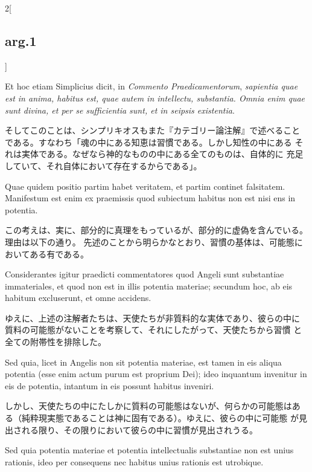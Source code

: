 \documentclass[paper=a4paper,fontsize=10pt,jafontsize=9pt,titlepage]{jlreq}
\begin{document}
\begin{paracol}{2}[\subsection{arg.1}]
\switchcolumn*

Et hoc etiam Simplicius dicit, in {\itshape Commento
 Praedicamentorum}, {\itshape sapientia quae est in anima, habitus est, quae
 autem in intellectu, substantia. Omnia enim quae sunt divina, et per
 se sufficientia sunt, et in seipsis existentia}.

\switchcolumn

そしてこのことは、シンプリキオスもまた『カテゴリー論注解』で述べること
 である。すなわち「魂の中にある知恵は習慣である。しかし知性の中にある
 それは実体である。なぜなら神的なものの中にある全てのものは、自体的に
 充足していて、それ自体において存在するからである」。

\switchcolumn*

Quae quidem positio
 partim habet veritatem, et partim continet falsitatem. Manifestum est
 enim ex praemissis quod subiectum habitus non est nisi ens in
 potentia.

\switchcolumn

この考えは、実に、部分的に真理をもっているが、部分的に虚偽を含んでいる。
 理由は以下の通り。
先述のことから明らかなとおり、習慣の基体は、可能態においてある有である。

\switchcolumn*

Considerantes igitur praedicti commentatores quod Angeli
 sunt substantiae immateriales, et quod non est in illis potentia
 materiae; secundum hoc, ab eis habitum excluserunt, et omne
 accidens.

\switchcolumn

ゆえに、上述の注解者たちは、天使たちが非質料的な実体であり、彼らの中に
 質料の可能態がないことを考察して、それにしたがって、天使たちから習慣
 と全ての附帯性を排除した。

\switchcolumn*

Sed quia, licet in Angelis non sit potentia materiae, est
 tamen in eis aliqua potentia (esse enim actum purum est proprium
 Dei); ideo inquantum invenitur in eis de potentia, intantum in eis
 possunt habitus inveniri.

\switchcolumn

しかし、天使たちの中にたしかに質料の可能態はないが、何らかの可能態はあ
 る（純粋現実態であることは神に固有である）。ゆえに、彼らの中に可能態
 が見出される限り、その限りにおいて彼らの中に習慣が見出されうる。

\switchcolumn*

Sed quia potentia materiae et potentia
 intellectualis substantiae non est unius rationis, ideo per
 consequens nec habitus unius rationis est utrobique.


\end{paracol}
\end{document}
